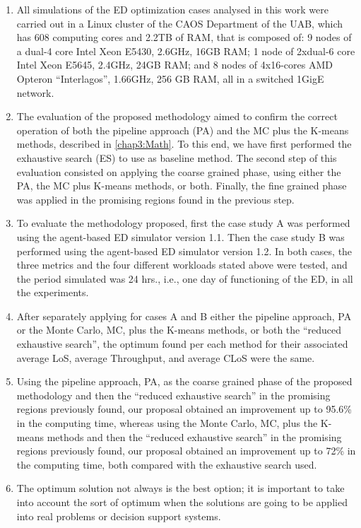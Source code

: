 \begin{enumerate}
\item All simulations of the ED optimization cases analysed in this work
were carried out in a Linux cluster of the CAOS Department of the
UAB, which has 608 computing cores and 2.2TB of RAM, that is composed
of: 9 nodes of a dual-4 core Intel Xeon E5430, 2.6GHz, 16GB RAM; 1
node of 2xdual-6 core Intel Xeon E5645, 2.4GHz, 24GB RAM; and 8 nodes
of 4x16-cores AMD Opteron ``Interlagos'', 1.66GHz, 256 GB RAM, all
in a switched 1GigE network.\\

\item The evaluation of the proposed methodology aimed to confirm the correct
operation of both the pipeline approach (PA) and the MC plus the K-means
methods, described in \ref{chap3:Math}. To this end, we have first
performed the exhaustive search (ES) to use as baseline method. The
second step of this evaluation consisted on applying the coarse grained
phase, using either the PA, the MC plus K-means methods, or both.
Finally, the fine grained phase was applied in the promising regions
found in the previous step.\\

\item To evaluate the methodology proposed, first the case study A was performed
using the agent-based ED simulator version 1.1. Then the case study
B was performed using the agent-based ED simulator version 1.2. In
both cases, the three metrics and the four different workloads stated
above were tested, and the period simulated was 24 hrs., i.e., one
day of functioning of the ED, in all the experiments.\\

\item After separately applying for cases A and B either the pipeline approach,
PA or the Monte Carlo, MC, plus the K-means methods, or both the \textquotedblleft{}reduced
exhaustive search\textquotedblright{}, the optimum found per each
method for their associated average LoS, average Throughput, and average
CLoS were the same.\\

\item Using the pipeline approach, PA, as the coarse grained phase of the
proposed methodology and then the \textquotedblleft{}reduced exhaustive
search\textquotedblright{} in the promising regions previously found,
our proposal obtained an improvement up to 95.6\% in the computing
time, whereas using the Monte Carlo, MC, plus the K-means methods
and then the \textquotedblleft{}reduced exhaustive search\textquotedblright{}
in the promising regions previously found, our proposal obtained an
improvement up to 72\% in the computing time, both compared with the
exhaustive search used.
\item The optimum solution not always is the best option; it is important
to take into account the sort of optimum when the solutions are going
to be applied into real problems or decision support systems.
\end{enumerate}


